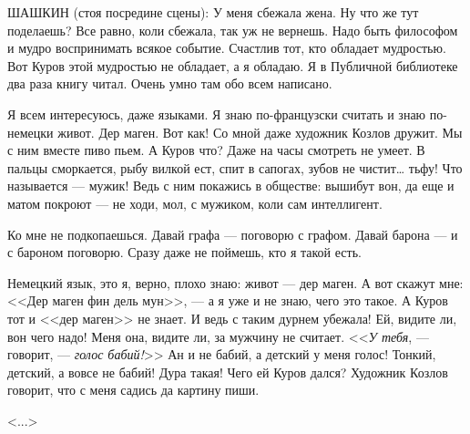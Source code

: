 ШАШКИН (стоя посредине сцены): У меня сбежала жена. Ну что же тут поделаешь? Все равно, коли сбежала, так уж не вернешь. Надо быть философом и мудро воспринимать всякое событие. Счастлив тот, кто обладает мудростью. Вот Куров этой мудростью не обладает, а я обладаю. Я в Публичной библиотеке два раза книгу читал. Очень умно там обо всем написано.

Я всем интересуюсь, даже языками. Я знаю по-французски считать и знаю по-немецки живот. Дер маген. Вот как! Со мной даже художник Козлов дружит. Мы с ним вместе пиво пьем. А Куров что? Даже на часы смотреть не умеет. В пальцы сморкается, рыбу вилкой ест, спит в сапогах, зубов не чистит\dots{} тьфу! Что называется --- мужик! Ведь с ним покажись в обществе: вышибут вон, да еще и матом покроют --- не ходи, мол, с мужиком, коли сам интеллигент.

Ко мне не подкопаешься. Давай графа --- поговорю с графом. Давай барона --- и с бароном поговорю. Сразу даже не поймешь, кто я такой есть.

Немецкий язык, это я, верно, плохо знаю: живот --- дер маген. А вот скажут мне: <<Дер маген фин дель мун>>, --- а я уже и не знаю, чего это такое. А Куров тот и <<дер маген>> не знает. И ведь с таким дурнем убежала! Ей, видите ли, вон чего надо! Меня она, видите ли, за мужчину не считает. <<\textit{У тебя}, --- говорит, --- \textit{голос бабий!}>> Ан и не бабий, а детский у меня голос! Тонкий, детский, а вовсе не бабий! Дура такая! Чего ей Куров дался? Художник Козлов говорит, что с меня садись да картину пиши.

\hfill <...>